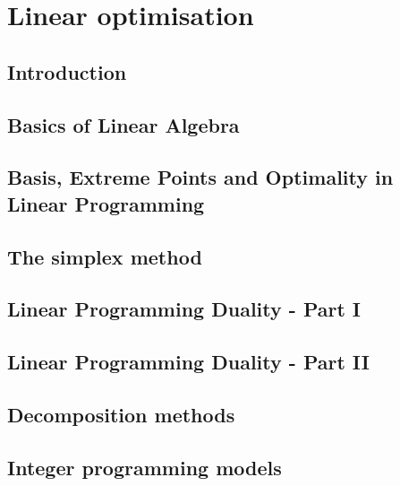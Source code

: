 \documentclass{bookest}
\begin{document}
	

	\tableofcontents
	
	\part{Linear optimisation} \label{part_1}
	
	\chapter{Introduction} \label{chapter_1}
	
	
	\chapter{Basics of Linear Algebra} \label{chapter_2}
	
	
	\chapter{Basis, Extreme Points and Optimality in Linear Programming} \label{chapter_3}
		 
	
	\chapter{The simplex method} \label{chapter_4}
		
		
	\chapter{Linear Programming Duality - Part I} \label{chapter_5}
		
	
	\chapter{Linear Programming Duality - Part II} \label{chapter_6}
	
	
	\chapter{Decomposition methods} \label{chapter_7}
	
	
	\chapter{Integer programming models} \label{chapter_8}
	
	
\end{document}
